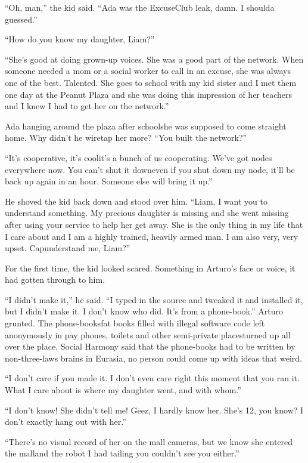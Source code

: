 “Oh, man,” the kid said. “Ada was the ExcuseClub leak, damn. I
shoulda guessed.”

“How do you know my daughter, Liam?”

“She’s good at doing grown-up voices. She was a good part of the
network. When someone needed a mom or a social worker to call in an
excuse, she was always one of the best. Talented. She goes to
school with my kid sister and I met them one day at the Peanut
Plaza and she was doing this impression of her teachers and I knew
I had to get her on the network.”

Ada hanging around the plaza after school{\dash}she was supposed to come
straight home. Why didn’t he wiretap her more? “You built the
network?”

“It’s cooperative, it’s cool{\dash}it’s a bunch of us cooperating. We’ve
got nodes everywhere now. You can’t shut it down{\dash}even if you shut
down my node, it’ll be back up again in an hour. Someone else will
bring it up.”

He shoved the kid back down and stood over him. “Liam, I want you
to understand something. My precious daughter is missing and she
went missing after using your service to help her get away. She is
the only thing in my life that I care about and I am a highly
trained, heavily armed man. I am also very, very upset.
Cap{\dash}understand me, Liam?”

For the first time, the kid looked scared. Something in Arturo’s
face or voice, it had gotten through to him.

“I didn’t make it,” he said. “I typed in the source and tweaked it
and installed it, but I didn’t make it. I don’t know who did. It’s
from a phone-book.” Arturo grunted. The phone-books{\dash}fat books
filled with illegal software code left anonymously in pay phones,
toilets and other semi-private places{\dash}turned up all over the place.
Social Harmony said that the phone-books had to be written by
non-three-laws brains in Eurasia, no person could come up with
ideas that weird.

“I don’t care if you made it. I don’t even care right this moment
that you ran it. What I care about is where my daughter went, and
with whom.”

“I don’t know! She didn’t tell me! Geez, I hardly know her. She’s
12, you know? I don’t exactly hang out with her.”

“There’s no visual record of her on the mall cameras, but we know
she entered the mall{\dash}and the robot I had tailing you couldn’t see
you either.”

